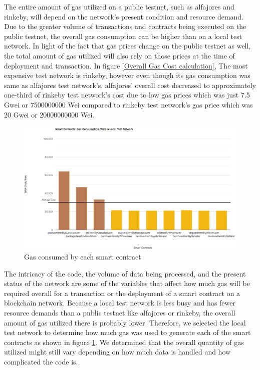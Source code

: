 \vspace{.5cm}

The entire amount of gas utilized on a public testnet, such as alfajores and rinkeby, will depend on the network's present condition and resource demand. Due to the greater volume of transactions and contracts being executed on the public testnet, the overall gas consumption can be higher than on a local test network. In light of the fact that gas prices change on the public testnet as well, the total amount of gas utilized will also rely on those prices at the time of deployment and transaction. In figure \ref{Overall Gas Cost calculation}, The most expensive test network is rinkeby, however even though its gas consumption was same as alfajores test network's, alfajores' overall cost decreased to approximately one-third of rinkeby test network's cost due to low gas prices which was just 7.5 Gwei or 7500000000 Wei compared to rinkeby test network's gas price which was 20 Gwei or 20000000000 Wei.

\begin{figure}[!h]
\centering
  \includegraphics[width=12cm]{includes/figures/smartcontractgas.png} 
  \caption{Gas consumed by each smart contract}
  \label{Gas consumed by each contract}
\end{figure}

\vspace{.5cm}
The intricacy of the code, the volume of data being processed, and the present status of the network are some of the variables that affect how much gas will be required overall for a transaction or the deployment of a smart contract on a blockchain network. Because a local test network is less busy and has fewer resource demands than a public testnet like alfajores or rinkeby, the overall amount of gas utilized there is probably lower. Therefore, we selected the local test network to determine how much gas was used to generate each of the smart contracts as shown in figure \ref{Gas consumed by each contract}. We determined that the overall quantity of gas utilized might still vary depending on how much data is handled and how complicated the code is.


